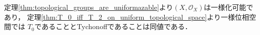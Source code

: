 	\begin{sketch}
		定理\ref{thm:topological_groups_are_uniformazable}より$\left(X,\mathscr{O}_X\right)$は一様化可能であり，
		定理\ref{thm:T_0_iff_T_2_on_uniform_topological_space}より一様位相空間では
		$T_0$であることとTychonoffであることは同値である．
		\QED
	\end{sketch}
	
	\begin{comment}
	\begin{screen}
		\begin{dfn}[不変位相]
			$\left(X,\mathscr{O}_X\right)$を群とし，$\mathscr{O}_X$を$X$上の位相とする．このとき，
			$X$の任意の部分集合$u$と$X$の任意の要素$x$に対して
			\begin{align}
				u \in \mathscr{O}_X \Longleftrightarrow
				\Set{\sigma_X(x,y)}{y \in u} \in \mathscr{O}_X
			\end{align}
			が成り立つとき，$\mathscr{O}_X$は$\sigma_X$に関して{\bf 左不変である}\index{ひだりふへん@左不変}{\bf (left invariant)}という．
			位相群の位相はその算法に関して左不変である．
		\end{dfn}
	\end{screen}
	\end{comment}